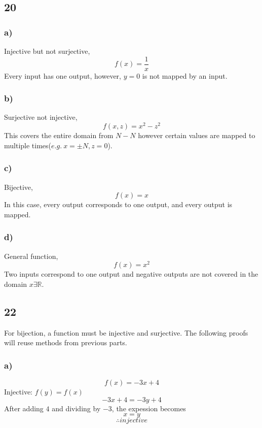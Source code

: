 \documentclass[journal]{IEEEtran}
\begin{document}
\subsection*{20}
    \subsubsection*{a)}
        Injective but not surjective,
        \begin{equation}
            \boxed{f(x) = \frac{1}{x}}
        \end{equation}
        Every input has one output, however, $y=0$ is not mapped by an input.

    \subsubsection*{b)}
    Surjective not injective,
    \begin{equation}
        \boxed{f(x,z) = x^2 - z^2}
    \end{equation}
    This covers the entire domain from $N-N$ however certain values are mapped to multiple times($e.g.~x = \pm N, z = 0$).
    
    \subsubsection*{c)}
    Bijective,
    \begin{equation}
        \boxed{f(x) = x}
    \end{equation}
    In this case, every output corresponds to one output, and every output is mapped.

    \subsubsection*{d)}
    General function,
    \begin{equation}
        \boxed{f(x) = x^2}
    \end{equation}
    Two inputs correspond to one output and negative outputs are not covered in the domain $x \exists \mathbb{R}$.

\subsection*{22}
    For bijection, a function must be injective and surjective.
    The following proofs will reuse methods from previous parts.
    \subsubsection*{a)}
    \begin{equation}
        f(x) = -3x + 4
    \end{equation}
        Injective: $f(y) = f(x)$
        \begin{equation}
            -3x + 4 = -3y + 4
        \end{equation}
        After adding $4$ and dividing by $-3$, the expession becomes
        \begin{equation}
            x = y
        \end{equation}
        $$\therefore injective$$
\end{document}
